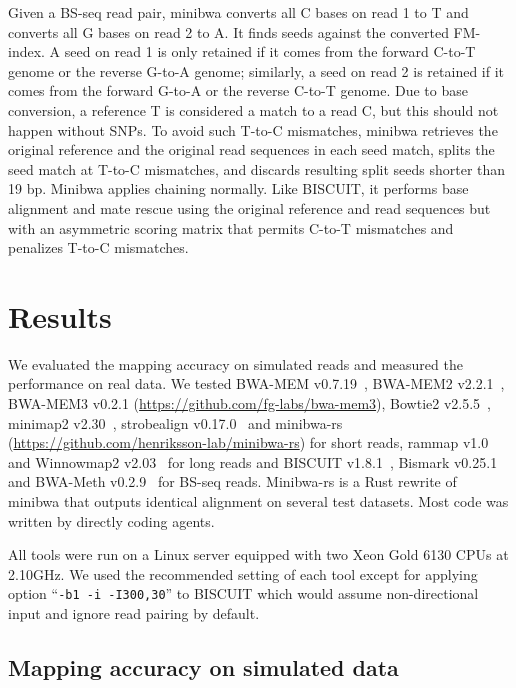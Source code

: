 \documentclass[webpdf,contemporary,large,namedate]{oup-authoring-template}%
\begin{document}
Given a BS-seq read pair, minibwa converts all C bases on read 1 to T
and converts all G bases on read 2 to A.
It finds seeds against the converted FM-index.
A seed on read 1 is only retained if it comes from the forward C-to-T genome or the reverse G-to-A genome;
similarly, a seed on read 2 is retained if it comes from the forward G-to-A or the reverse C-to-T genome.
Due to base conversion, a reference T is considered a match to a read C, but this should not happen without SNPs.
To avoid such T-to-C mismatches, minibwa retrieves the original reference and the original read sequences in each seed match,
splits the seed match at T-to-C mismatches, and discards resulting split seeds shorter than 19 bp.
Minibwa applies chaining normally.
Like BISCUIT, it performs base alignment and mate rescue using the original reference and read sequences but with
an asymmetric scoring matrix that permits C-to-T mismatches and penalizes T-to-C mismatches.

\section{Results}

We evaluated the mapping accuracy on simulated reads and
measured the performance on real data.
We tested BWA-MEM v0.7.19~\citep{Li:2013aa}, BWA-MEM2 v2.2.1~\citep{DBLP:conf/ipps/VasimuddinMLA19},
BWA-MEM3 v0.2.1 (\url{https://github.com/fg-labs/bwa-mem3}),
Bowtie2 v2.5.5~\citep{Langmead:2012fk},
minimap2 v2.30~\citep{Li:2018ab},
strobealign v0.17.0~\citep{Sahlin:2022aa}
and minibwa-rs (\url{https://github.com/henriksson-lab/minibwa-rs}) for short reads,
rammap v1.0~\citep{Wang2026.05.26.726289} and
Winnowmap2 v2.03~\citep{Jain:2020aa,Jain:2022ua} for long reads
and BISCUIT v1.8.1~\citep{Zhou:2024ac}, Bismark v0.25.1~\citep{Krueger:2011aa}
and BWA-Meth v0.2.9~\citep{Pedersen:2014aa} for BS-seq reads.
Minibwa-rs is a Rust rewrite of minibwa that outputs identical alignment on several test datasets.
Most code was written by directly coding agents.

All tools were run on a Linux server equipped with two Xeon Gold 6130 CPUs at 2.10GHz.
We used the recommended setting of each tool except for applying option ``{\tt -b1 -i -I300,30}'' to BISCUIT
which would assume non-directional input and ignore read pairing by default.

\subsection{Mapping accuracy on simulated data}\label{sec:eval-sim}
\end{document}

